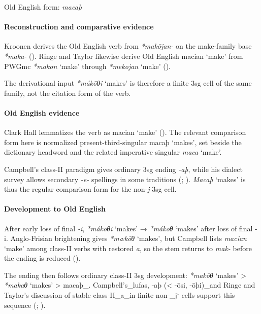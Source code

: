 \documentclass[
  british,
  a4paper,
]{article}
\providecommand{\Recon}[1]{\emph{*#1}}
\begin{document}
Old English form: \emph{macaþ}

\paragraph{Reconstruction and comparative
evidence}\label{reconstruction-and-comparative-evidence-136}

Kroonen derives the Old English verb from {\emph{*makōjan-}} on the
make-family base \emph{*maka-} (). Ringe and Taylor likewise derive Old English {macian} `make' from
PWGmc \Recon{makon} `make' through \Recon{mekojan} `make'
().

The derivational input \Recon{mákōθi} `makes' is therefore a finite 3sg
cell of the same family, not the citation form of the verb.

\paragraph{Old English evidence}\label{old-english-evidence-138}

Clark Hall lemmatizes the verb as {macian} `make'
(). The relevant
comparison form here is normalized present-third-singular {macaþ}
`makes', set beside the dictionary headword and the related imperative
singular {\emph{maca}} `make'.

Campbell's class-II paradigm gives ordinary 3sg ending \emph{-aþ}, while
his dialect survey allows secondary \emph{-e-} spellings in some
traditions (;
). {\emph{Macaþ}} `makes' is
thus the regular comparison form for the non-\emph{j} 3sg cell.

\paragraph{Development to Old
English}\label{development-to-old-english-136}

After early loss of final \emph{-i}, \Recon{mákōθi} `makes' →
\Recon{mákōθ} `makes' after loss of final -i. Anglo-Frisian brightening
gives \Recon{mækōθ} `makes', but Campbell lists {\emph{macian}} `make'
among class-II verbs with restored \emph{a}, so the stem returns to
\emph{mak-} before the ending is reduced
().

The ending then follows ordinary class-II 3sg development: \Recon{makōθ}
`makes' \textgreater{} \Recon{makaθ} `makes' \textgreater{} macaþ\_.
Campbell's\_lufas, -aþ (\textless{} -ōsi, -ōþi)\_and Ringe and Taylor's
discussion of stable class-II\_a\_in finite non-\_j` cells support this
sequence (;
).
\end{document}

